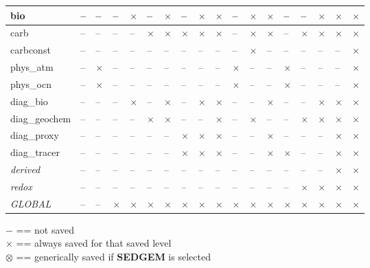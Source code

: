 \documentclass[11pt,fleqn]{book} %
\begin{document}
\begin{table}[h]
\begin{tabular}{|l||p{0.2cm}|p{0.25cm}|p{0.25cm}|p{0.25cm}|p{0.25cm}|p{0.25cm}|p{0.25cm}|p{0.25cm}|p{0.25cm}|p{0.25cm}|p{0.25cm}|p{0.25cm}|p{0.25cm}|p{0.25cm}|p{0.25cm}|p{0.25cm}|p{0.25cm}|}
bio & -- & -- & -- & \(\times\) & -- & \(\times\) & -- & \(\times\) & \(\times\) & -- & \(\times\) & \(\times\) & -- & -- & \(\times\) & \(\times\) & \(\times\)  \\\hline
carb & -- & -- & -- & -- & \(\times\) & \(\times\) & \(\times\) & \(\times\) & \(\times\) & -- & \(\times\) & \(\times\) & -- & \(\times\) & \(\times\) & \(\times\) & \(\times\)  \\\hline
carbconst & -- & -- & -- & -- & -- & -- & -- & -- & -- & -- & \(\times\) & -- & -- & -- & -- & -- & \(\times\)  \\\hline
phys\_atm & -- & \(\times\) & -- & -- & -- & -- & -- & -- & -- & \(\times\) & -- & -- & \(\times\) & -- & -- & -- & \(\times\)  \\\hline
phys\_ocn & -- & \(\times\) & -- & -- & -- & -- & -- & -- & -- & \(\times\) & -- & -- & \(\times\) & -- & -- & -- & \(\times\)  \\\hline
diag\_bio & -- & -- & -- & \(\times\) & -- & \(\times\) & -- & \(\times\) & \(\times\) & -- & -- & \(\times\) & -- & -- & \(\times\) & \(\times\) & \(\times\)  \\\hline
diag\_geochem & -- & -- & -- & -- & \(\times\) & \(\times\) & -- & -- & \(\times\) & -- & \(\times\) & -- & -- & \(\times\) & \(\times\) & \(\times\) & \(\times\)  \\\hline
diag\_proxy & -- & -- & -- & -- & -- & -- & \(\times\) & \(\times\) & \(\times\) & -- & -- & \(\times\) & -- & -- & -- & \(\times\) & \(\times\)  \\\hline
diag\_tracer & -- & -- & -- & -- & -- & -- & \(\times\) & \(\times\) & \(\times\) & -- & -- & \(\times\) & \(\times\) & -- & -- & \(\times\) & \(\times\)  \\\hline
\textit{derived} & -- & -- & -- & -- & -- & -- & -- & -- & -- & -- & -- & -- & -- & -- & -- & \(\times\) & \(\times\) \\\hline
\textit{redox} & -- & -- & -- & -- & -- & -- & -- & -- & -- & -- & -- & -- & -- & \(\times\) & \(\times\) & \(\times\) & \(\times\) \\\hline
\textit{GLOBAL} & -- & -- & \(\times\) & \(\times\) & \(\times\) & \(\times\) & \(\times\) & \(\times\) & \(\times\) & \(\times\) & \(\times\) & \(\times\) & \(\times\) & \(\times\) & \(\times\) & \(\times\) & \(\times\) \\\hline
\end{tabular}
\label{tab:timeslicelevels}
\end{table}

\noindent \(-\) == not saved\\
\(\times\) == always saved  for that saved level\\
\(\otimes\) == generically saved if \textbf{SEDGEM} is selected
\end{document}
